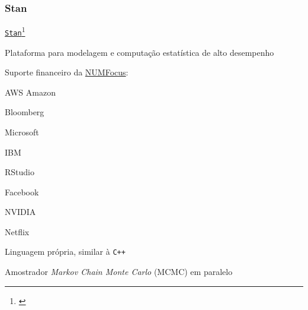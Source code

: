 \subsubsection{Stan}

\begin{frame}{\href{https://mc-stan.org}{\texttt{Stan}}\footnote{\citet*{carpenterStanProbabilisticProgramming2017}}}
    \begin{vfilleditems}
        \item Plataforma para modelagem e computação estatística de alto desempenho
        \item Suporte financeiro da \href{https://numfocus.org/}{NUMFocus}:
        \begin{vfilleditems}
            \item AWS Amazon
            \item Bloomberg
            \item Microsoft
            \item IBM
            \item RStudio
            \item Facebook
            \item NVIDIA
            \item Netflix
        \end{vfilleditems}
        \item Linguagem própria, similar à \texttt{C++}
        \item Amostrador \textit{Markov Chain Monte Carlo} (MCMC) em paralelo 
    \end{vfilleditems}
\end{frame}

